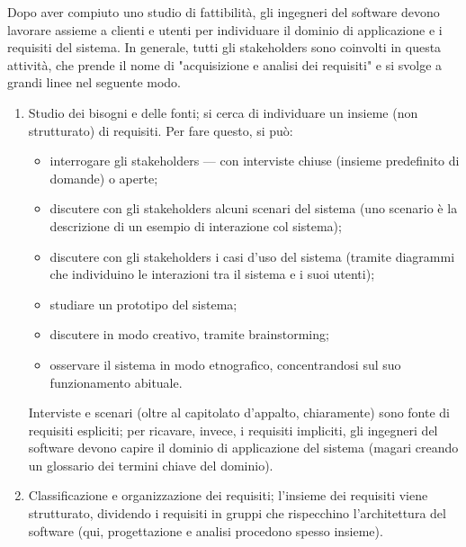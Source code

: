 \documentclass[a4paper]{article}
\begin{document}
		
Dopo aver compiuto uno studio di fattibilità, gli ingegneri del software devono lavorare assieme a clienti e utenti per individuare il dominio di applicazione e i requisiti del sistema. In generale, tutti gli stakeholders sono coinvolti in questa attività, che prende il nome di "acquisizione e analisi dei requisiti" e si svolge a grandi linee nel seguente modo.
		
	\begin{enumerate}
		
			
	\item Studio dei bisogni e delle fonti; si cerca di individuare un insieme (non strutturato) di requisiti. Per fare questo, si può:
				
	\begin{itemize}
		
					
	\item interrogare gli stakeholders --- con interviste chiuse (insieme predefinito di domande) o aperte;
					
	\item discutere con gli stakeholders alcuni scenari del sistema (uno scenario è la descrizione di un esempio di interazione col sistema);
					
	\item discutere con gli stakeholders i casi d'uso del sistema (tramite diagrammi che individuino le interazioni tra il sistema e i suoi utenti);
					
	\item studiare un prototipo del sistema;
					
	\item discutere in modo creativo, tramite brainstorming;
					
	\item osservare il sistema in modo etnografico, concentrandosi sul suo funzionamento abituale.
				
	\end{itemize}

			Interviste e scenari (oltre al capitolato d'appalto, chiaramente) sono fonte di requisiti espliciti; per ricavare, invece, i requisiti impliciti, gli ingegneri del software devono capire il dominio di applicazione del sistema (magari creando un glossario dei termini chiave del dominio).
			
			
	\item Classificazione e organizzazione dei requisiti; l'insieme dei requisiti viene strutturato, dividendo i requisiti in gruppi che rispecchino l'architettura del software (qui, progettazione e analisi procedono spesso insieme).
			

\end{enumerate}
\end{document}
